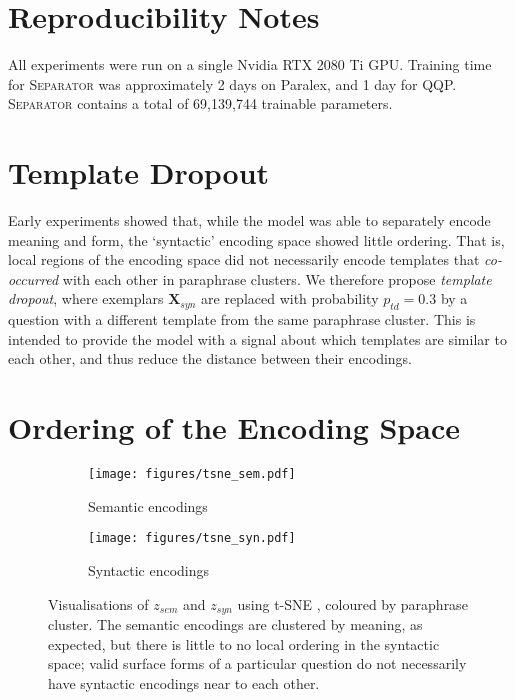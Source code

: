 \documentclass[11pt,a4paper]{article}
\begin{document}
\section{Reproducibility Notes}
\label{sec:reproducibility}

All experiments were run on a single Nvidia RTX 2080 Ti GPU. Training time for \textsc{Separator} was approximately 2 days on Paralex, and 1 day for QQP. \textsc{Separator} contains a total of 69,139,744 trainable parameters.



\section{Template Dropout}
\label{sec:templatedropout}

Early experiments showed that, while the model was able to separately encode meaning and form, the `syntactic' encoding space showed little ordering. That is, local regions of the encoding space did not necessarily encode templates that \textit{co-occurred} with each other in paraphrase clusters. We therefore propose \textit{template dropout}, where exemplars $\textbf{X}_{syn}$ are replaced with  probability $p_{td} = 0.3$ by a question with a different template from the same paraphrase cluster. This is intended to provide the model with a signal about which templates are similar to each other, and thus reduce the distance between their encodings.

\section{Ordering of the Encoding Space}
\label{sec:ordering}



\begin{figure}[!t]
    \centering
    \begin{subfigure}[b]{0.4\textwidth}
         \centering
         \texttt{[image: figures/tsne\_sem.pdf]}
         \caption{Semantic encodings}
         \label{fig:tsne_sem}
     \end{subfigure}
\begin{subfigure}[b]{0.4\textwidth}
         \centering
         \texttt{[image: figures/tsne\_syn.pdf]}
         \caption{Syntactic encodings}
         \label{fig:tsne_syn}
     \end{subfigure}
    \caption{Visualisations of $z_{sem}$ and $z_{syn}$ using t-SNE \cite{tsne}, coloured by paraphrase cluster. The semantic encodings are clustered by meaning, as expected, but there is little to no local ordering in the syntactic space; valid surface forms of a particular question do not necessarily have  syntactic encodings near to each other.}
    \label{fig:tsne}
\end{figure}
\end{document}
